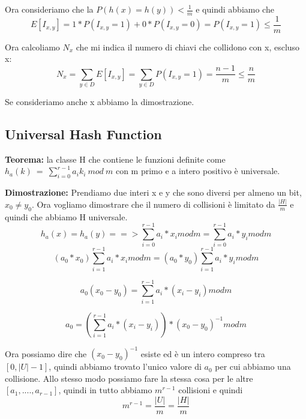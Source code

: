 \documentclass[12pt]{article}
\begin{document}
Ora consideriamo che la $P(h(x)=h(y)) < \frac{1}{m}$ e quindi abbiamo che 
\begin{equation}
E[I_{x,y}] = 1*P(I_{x,y}=1) + 0* P(I_{x,y}=0) = P(I_{x,y}=1) \leq \frac{1}{m}
\end{equation}

Ora calcoliamo $N_x$ che mi indica il numero di chiavi che collidono con x, escluso x:
\begin{equation}
N_x = \sum_{y \in D} E[I_{x,y}] = \sum_{y \in D} P(I_{x,y}=1) = \frac{n-1}{m} \leq \frac{n}{m}
\end{equation}

Se consideriamo anche x abbiamo la dimostrazione.


\subsection{Universal Hash Function}


\textbf{Teorema: } la classe H che contiene le funzioni definite come $h_a(k)\ =\ \sum^{r-1}_{i=0}a_ik_i\ mod\ m$ con m primo e a intero positivo è universale.

\textbf{Dimostrazione: } Prendiamo due interi x e y che sono diversi per almeno un bit, $x_0 \neq y_0$. 
Ora vogliamo dimostrare che il numero di collisioni è limitato da $\frac{|H|}{m}$ e quindi che abbiamo H universale.
\begin{equation}
h_a(x) = h_a(y) ==> \sum^{r-1}_{i=0} a_i*x_i mod m = \sum^{r-1}_{i=0} a_i*y_i mod m 
\end{equation}
\begin{equation}
 (a_0*x_0)\sum^{r-1}_{i=1} a_i*x_i mod m = (a_0*y_0)\sum^{r-1}_{i=1} a_i*y_i mod m
\end{equation}

\begin{equation}
a_0(x_0-y_0) = \sum^{r-1}_{i=1} a_i*(x_i-y_i) mod m
\end{equation}

\begin{equation}
a_0 = (\sum^{r-1}_{i=1} a_i*(x_i-y_i))*(x_0-y_0)^{-1} mod m
\end{equation}

Ora possiamo dire che $(x_0-y_0)^{-1}$ esiste ed è un intero compreso tra $[0,|U|-1]$, quindi abbiamo trovato l'unico valore di $a_0$ per cui abbiamo una collisione. Allo stesso modo possiamo fare la stessa cosa per le altre $[a_1,....,a_{r-1}]$, quindi in tutto abbiamo $m^{r-1}$ collisioni e quindi 
\begin{equation}
m^{r-1} = \frac{|U|}{m} = \frac{|H|}{m}
\end{equation}
\end{document}
